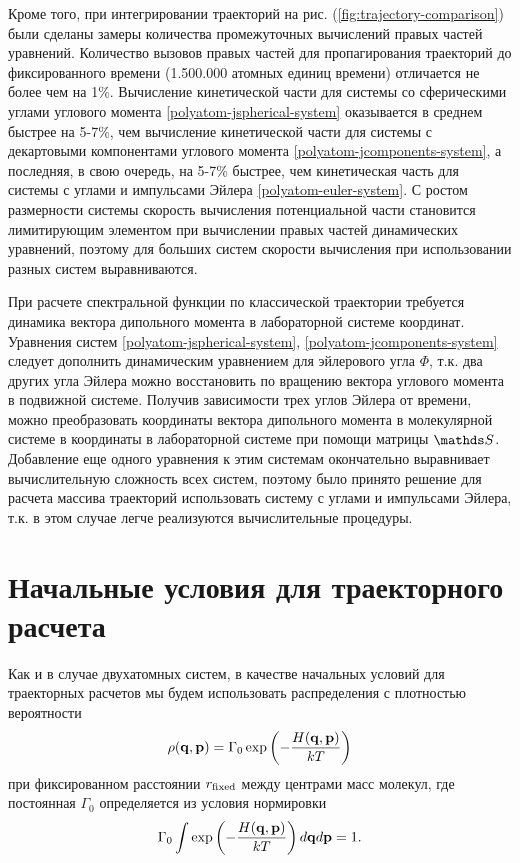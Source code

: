 Кроме того, при интегрировании траекторий на рис. (\ref{fig:trajectory-comparison}) были сделаны замеры количества промежуточных вычислений правых частей уравнений. Количество вызовов правых частей для пропагирования траекторий до фиксированного времени (1.500.000 атомных единиц времени) отличается не более чем на 1\%. Вычисление кинетической части для системы со сферическими углами углового момента \eqref{polyatom-jspherical-system} оказывается в среднем быстрее на 5-7\%, чем вычисление кинетической части для системы с декартовыми компонентами углового момента \eqref{polyatom-jcomponents-system}, а последняя, в свою очередь, на 5-7\% быстрее, чем кинетическая часть для системы с углами и импульсами Эйлера \eqref{polyatom-euler-system}. С ростом размерности системы скорость вычисления потенциальной части становится лимитирующим элементом при вычислении правых частей динамических уравнений, поэтому для больших систем скорости вычисления при использовании разных систем выравниваются. \par
При расчете спектральной функции по классической траектории требуется динамика вектора дипольного момента в лабораторной системе координат. Уравнения систем \eqref{polyatom-jspherical-system}, \eqref{polyatom-jcomponents-system} следует дополнить динамическим уравнением для эйлерового угла $\Phi$, т.к. два других угла Эйлера можно восстановить по вращению вектора углового момента в подвижной системе. Получив зависимости трех углов Эйлера от времени, можно преобразовать координаты вектора дипольного момента в молекулярной системе в координаты в лабораторной системе при помощи матрицы $\bbS$. Добавление еще одного уравнения к этим системам окончательно выравнивает вычислительную сложность всех систем, поэтому было принято решение для расчета массива траекторий использовать систему с углами и импульсами Эйлера, т.к. в этом случае легче реализуются вычислительные процедуры.

\section{Начальные условия для траекторного расчета}

Как и в случае двухатомных систем, в качестве начальных условий для траекторных расчетов мы будем использовать распределения с плотностью вероятности
\begin{gather}
    \rho(\mathbf{q}, \mathbf{p}) = \Gamma_0 \exp \left( -\frac{H(\mathbf{q}, \mathbf{p})}{kT} \right)
\end{gather}
%
при фиксированном расстоянии $r_\text{fixed}$ между центрами масс молекул, где постоянная $\Gamma_0$ определяется из условия нормировки
\begin{gather}
    \Gamma_0 \int \exp \left( -\frac{H(\mathbf{q}, \mathbf{p})}{k T} \right) d \mathbf{q} d\mathbf{p} = 1.
\end{gather}

